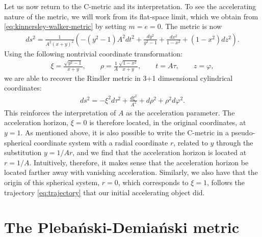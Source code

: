 \documentclass[
twoside,
openright,
frontopenright,
]{dmathesis}
\begin{document}
Let us now return to the C-metric and its interpretation. To see the
accelerating nature of the metric, we will work from its flat-space limit, which
we obtain from \cref{eq:kinnersley-walker-metric} by setting $m=e=0$. The metric
is now
\begin{align}
  \label{eq:flatlimit}
  ds^2=\frac{1}{A^2(x+y)^2}\left(-(y^2-1)A^2dt^2+\frac{dy^2}{y^2-1} +
  \frac{dx^2}{1-x^2} + (1-x^2)dz^2\right).
\end{align}
Using the following nontrivial coordinate transformation:
\begin{align}
  \xi = \frac{\sqrt{y^2-1}}{x + y}, \qquad \rho =
  \frac{1}{A}\frac{\sqrt{1-x^2}}{x+y}, \qquad t=A\tau, \qquad z=\varphi,
\end{align}
we are able to recover the Rindler metric in 3+1 dimsensional cylindrical
coordinates:
\begin{align}
  \label{eq:rindler}
  ds^2 = -\xi^2 d\tau^2 + \frac{d\xi^2}{A^2} + d\rho^2 + \rho^2 d\varphi^2.
\end{align}
This reinforces the interpretation of $A$ as the acceleration parameter. The
acceleration horizon, $\xi = 0$ is therefore located, in the original
coordinates, at $y = 1$. As mentioned above, it is also possible to write the
C-metric in a pseudo-spherical coordinate system with a radial coordinate $r$,
related to $y$ through the substitution $y = 1/Ar$, and we find that the
acceleration horizon is located at $r = 1/A$. Intuitively, therefore, it makes
sense that the acceleration horizon be located farther away with vanishing
acceleration. Similarly, we also have that the origin of this spherical system,
$r = 0$, which corresponds to $\xi = 1$, follows the trajectory
\eqref{eq:trajectory} that our initial accelerating object did.


\section{The Pleba\'nski-Demia\'nski metric}
\label{sec:PD}
\end{document}
